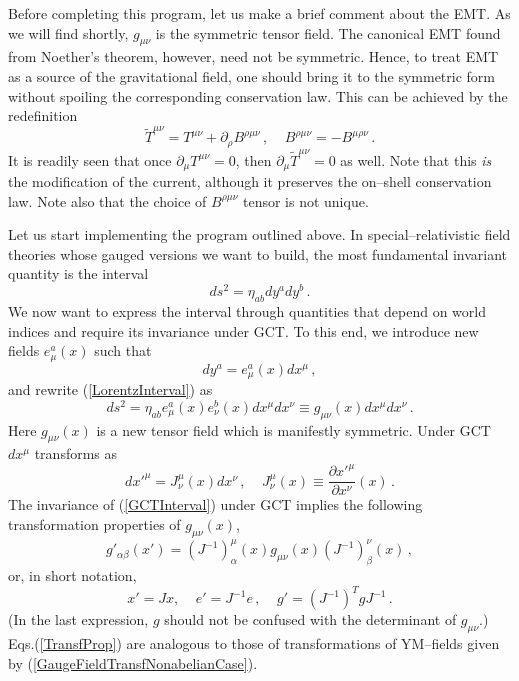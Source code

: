 \documentclass[11pt,a4paper]{article}
\begin{document}
Before completing this program, let us make a brief comment about the EMT. As we will find shortly, $g_{\mu\nu}$ is the symmetric tensor field. The canonical EMT found from Noether's theorem, however, need not be symmetric. Hence, to treat EMT as a source of the gravitational field, one should bring it to the symmetric form without spoiling the corresponding conservation law. This can be achieved by the redefinition \cite{DiFrancesco:1997nk}
\begin{equation}
\tilde{T}^{\mu\nu}=T^{\mu\nu}+\partial_\rho B^{\rho\mu\nu} \,, ~~~~~ B^{\rho\mu\nu}=-B^{\mu\rho\nu} \,.
\end{equation}
It is readily seen that once $\partial_\mu T^{\mu\nu}=0$, then $\partial_\mu \tilde{T}^{\mu\nu}=0$ as well. Note that this \textit{is} the modification of the current, although it preserves the on--shell conservation law. Note also that the choice of $B^{\rho\mu\nu}$ tensor is not unique.

Let us start implementing the program outlined above. In special--relativistic field theories whose gauged versions we want to build, the most fundamental invariant quantity is the interval
\begin{equation}\label{LorentzInterval}
ds^2=\eta_{ab}dy^a dy^b \,.
\end{equation}
We now want to express the interval through quantities that depend on world indices and require its invariance under GCT. To this end, we introduce new fields $e^a_\mu(x)$ such that
\begin{equation}
dy^a = e^a_\mu(x) dx^\mu \,,
\end{equation}
and rewrite (\ref{LorentzInterval}) as
\begin{equation}\label{GCTInterval}
ds^2=\eta_{ab}e^a_\mu(x)e^b_\nu(x)dx^\mu dx^\nu \equiv g_{\mu\nu}(x)dx^\mu dx^\nu \,.
\end{equation}
Here $g_{\mu\nu}(x)$ is a new tensor field which is manifestly symmetric. Under GCT $dx^\mu$ transforms as
\begin{equation}
dx'^\mu=J^\mu_\nu(x) dx^\nu \,, ~~~~~ J^\mu_\nu(x)\equiv\dfrac{\partial x'^\mu}{\partial x^\nu}(x) \,.
\end{equation}
The invariance of (\ref{GCTInterval}) under GCT implies the following transformation properties of $g_{\mu\nu}(x)$,
\begin{equation}
g'_{\alpha\beta}(x')=(J^{-1})^\mu_\alpha(x) g_{\mu\nu}(x)(J^{-1})^\nu_\beta(x) \,,
\end{equation}
or, in short notation,
\begin{equation}\label{TransfProp}
x'=Jx, ~~~~~e'=J^{-1}e \,,~~~~~ g'=(J^{-1})^TgJ^{-1} \,.
\end{equation}
(In the last expression, $g$ should not be confused with the determinant of $g_{\mu\nu}$.) Eqs.(\ref{TransfProp}) are analogous to those of transformations of YM--fields given by (\ref{GaugeFieldTransfNonabelianCase}).
\end{document}
